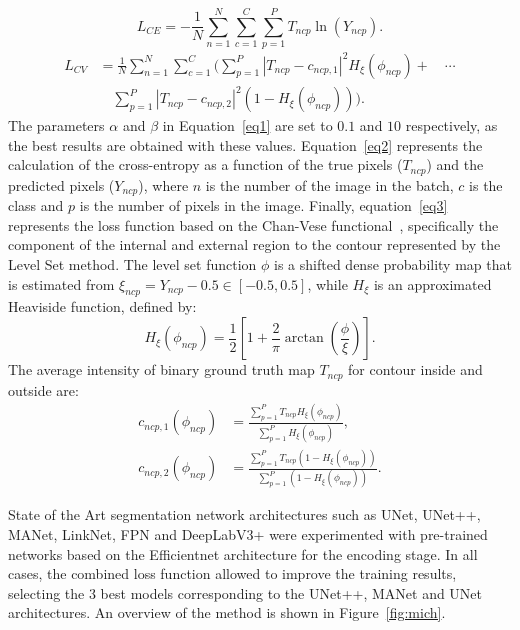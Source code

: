 \documentclass[twocolumn]{article}
\begin{document}
\begin{equation}
    L_{CE} = -\frac{1}{N}\sum_{n=1}^{N} \sum_{c=1}^{C} \sum_{p=1}^{P} T_{ncp} \ln\left ( Y_{ncp} \right ).
\label{eq2}\end{equation}
\begin{equation}
\begin{aligned}
    L_{CV}  & = \frac{1}{N}\sum_{n=1}^{N}\sum_{c=1}^{C} \Biggl( \sum_{p=1}^{P} \left | T_{ncp}-c_{ncp,1} \right |^{2}H_{\xi}\left(\phi_{ncp}\right)  + \quad\cdots \\
    &\quad \sum_{p=1}^{P} \left | T_{ncp}-c_{ncp,2} \right |^{2} \left ( 1 - H_{\xi}\left(\phi_{ncp}\right) \right )  \Biggr).
\end{aligned}
\label{eq3}\end{equation}
The parameters $\alpha$ and $\beta$ in Equation~\ref{eq1} are set to $0.1$ and $10$ respectively, as the best results are obtained with these values. Equation~\ref{eq2} represents the calculation of the cross-entropy as a function of the true pixels ($T_{ncp}$) and the predicted pixels ($Y_{ncp}$), where $n$ is the number of the image in the batch, $c$ is the class and $p$ is the number of pixels in the image. Finally, equation~\ref{eq3} represents the loss function based on the Chan-Vese functional~\cite{mich_1}, specifically the component of the internal and external region to the contour represented by the Level Set method.
\color{black}
The level set function $\phi$ is a shifted dense probability map that is estimated from $\xi_{ncp}=Y_{ncp}-0.5 \in [-0.5, 0.5]$, while $H_{\xi}$ is an approximated Heaviside function, defined by: 
\begin{equation}
H_{\xi}\left(\phi_{ncp}\right) = \frac{1}{2}\left [ 1+\frac{2}{\pi} \arctan\left ( \frac{\phi}{\xi} \right )\right ].
\end{equation}
The average intensity of binary ground truth map $T_{ncp}$ for contour inside and outside are:
\begin{align}
c_{ncp,1}\left ( \phi_{ncp}  \right ) & = \frac{\sum_{p=1}^{P}T_{ncp}H_{\xi}\left(\phi_{ncp}\right)}{\sum_{p=1}^{P}H_{\xi}\left(\phi_{ncp}\right)},\\ 
c_{ncp,2}\left ( \phi_{ncp}  \right ) & = 
\frac{\sum_{p=1}^{P}T_{ncp}\left ( 1 - H_{\xi}\left(\phi_{ncp}\right) \right )}{\sum_{p=1}^{P}\left ( 1 - H_{\xi}\left(\phi_{ncp}\right) \right )}.
\end{align}


State of the Art segmentation network architectures such as UNet, UNet++, MANet, LinkNet, FPN and DeepLabV3+ were experimented with pre-trained networks based on the Efficientnet architecture for the encoding stage. In all cases, the combined loss function allowed to improve the training results, selecting the 3 best models corresponding to the UNet++, MANet and UNet architectures. An overview of the method is shown in Figure~\ref{fig:mich}.
\end{document}
